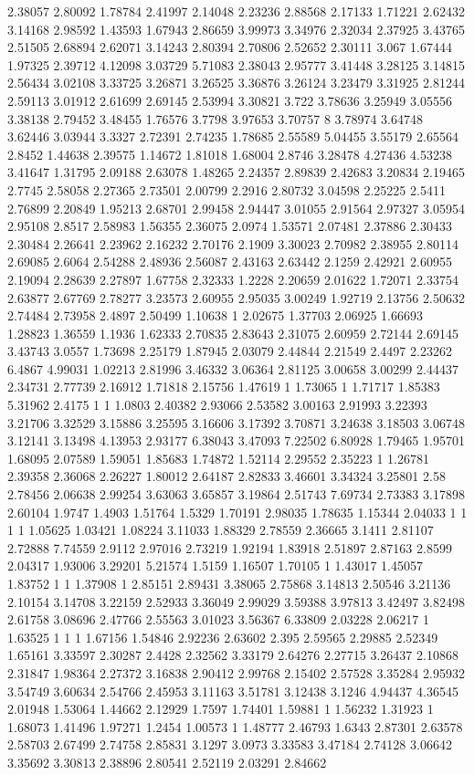 2.38057 2.80092 1.78784 2.41997 2.14048 2.23236 2.88568 2.17133 1.71221 2.62432 3.14168 2.98592 1.43593 1.67943 2.86659 3.99973 3.34976 2.32034 2.37925 3.43765 2.51505 2.68894 2.62071 3.14243 2.80394 2.70806 2.52652 2.30111 3.067 1.67444 1.97325 2.39712 4.12098 3.03729 5.71083 2.38043 2.95777 3.41448 3.28125 3.14815 2.56434 3.02108 3.33725 3.26871 3.26525 3.36876 3.26124 3.23479 3.31925 2.81244 2.59113 3.01912 2.61699 2.69145 2.53994 3.30821 3.722 3.78636 3.25949 3.05556 3.38138 2.79452 3.48455 1.76576 3.7798 3.97653 3.70757 8 3.78974 3.64748 3.62446 3.03944 3.3327 2.72391 2.74235 1.78685 2.55589 5.04455 3.55179 2.65564 2.8452 1.44638 2.39575 1.14672 1.81018 1.68004 2.8746 3.28478 4.27436 4.53238 3.41647 1.31795 2.09188 2.63078 1.48265 2.24357 2.89839 2.42683 3.20834 2.19465 2.7745 2.58058 2.27365 2.73501 2.00799 2.2916 2.80732 3.04598 2.25225 2.5411 2.76899 2.20849 1.95213 2.68701 2.99458 2.94447 3.01055 2.91564 2.97327 3.05954 2.95108 2.8517 2.58983 1.56355 2.36075 2.0974 1.53571 2.07481 2.37886 2.30433 2.30484 2.26641 2.23962 2.16232 2.70176 2.1909 3.30023 2.70982 2.38955 2.80114 2.69085 2.6064 2.54288 2.48936 2.56087 2.43163 2.63442 2.1259 2.42921 2.60955 2.19094 2.28639 2.27897 1.67758 2.32333 1.2228 2.20659 2.01622 1.72071 2.33754 2.63877 2.67769 2.78277 3.23573 2.60955 2.95035 3.00249 1.92719 2.13756 2.50632 2.74484 2.73958 2.4897 2.50499 1.10638 1 2.02675 1.37703 2.06925 1.66693 1.28823 1.36559 1.1936 1.62333 2.70835 2.83643 2.31075 2.60959 2.72144 2.69145 3.43743 3.0557 1.73698 2.25179 1.87945 2.03079 2.44844 2.21549 2.4497 2.23262 6.4867 4.99031 1.02213 2.81996 3.46332 3.06364 2.81125 3.00658 3.00299 2.44437 2.34731 2.77739 2.16912 1.71818 2.15756 1.47619 1 1.73065 1 1.71717 1.85383 5.31962 2.4175 1 1 1.0803 2.40382 2.93066 2.53582 3.00163 2.91993 3.22393 3.21706 3.32529 3.15886 3.25595 3.16606 3.17392 3.70871 3.24638 3.18503 3.06748 3.12141 3.13498 4.13953 2.93177 6.38043 3.47093 7.22502 6.80928 1.79465 1.95701 1.68095 2.07589 1.59051 1.85683 1.74872 1.52114 2.29552 2.35223 1 1.26781 2.39358 2.36068 2.26227 1.80012 2.64187 2.82833 3.46601 3.34324 3.25801 2.58 2.78456 2.06638 2.99254 3.63063 3.65857 3.19864 2.51743 7.69734 2.73383 3.17898 2.60104 1.9747 1.4903 1.51764 1.5329 1.70191 2.98035 1.78635 1.15344 2.04033 1 1 1 1 1.05625 1.03421 1.08224 3.11033 1.88329 2.78559 2.36665 3.1411 2.81107 2.72888 7.74559 2.9112 2.97016 2.73219 1.92194 1.83918 2.51897 2.87163 2.8599 2.04317 1.93006 3.29201 5.21574 1.5159 1.16507 1.70105 1 1.43017 1.45057 1.83752 1 1 1.37908 1 2.85151 2.89431 3.38065 2.75868 3.14813 2.50546 3.21136 2.10154 3.14708 3.22159 2.52933 3.36049 2.99029 3.59388 3.97813 3.42497 3.82498 2.61758 3.08696 2.47766 2.55563 3.01023 3.56367 6.33809 2.03228 2.06217 1 1.63525 1 1 1 1.67156 1.54846 2.92236 2.63602 2.395 2.59565 2.29885 2.52349 1.65161 3.33597 2.30287 2.4428 2.32562 3.33179 2.64276 2.27715 3.26437 2.10868 2.31847 1.98364 2.27372 3.16838 2.90412 2.99768 2.15402 2.57528 3.35284 2.95932 3.54749 3.60634 2.54766 2.45953 3.11163 3.51781 3.12438 3.1246 4.94437 4.36545 2.01948 1.53064 1.44662 2.12929 1.7597 1.74401 1.59881 1 1.56232 1.31923 1 1.68073 1.41496 1.97271 1.2454 1.00573 1 1.48777 2.46793 1.6343 2.87301 2.63578 2.58703 2.67499 2.74758 2.85831 3.1297 3.0973 3.33583 3.47184 2.74128 3.06642 3.35692 3.30813 2.38896 2.80541 2.52119 2.03291 2.84662 
